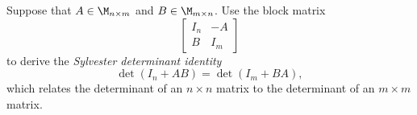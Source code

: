 \documentclass{homework}
\begin{document}
\begin{problem}[P.3.29]
  Suppose that \(A \in \M_{n\times m}\) and
  \(B \in \M_{m\times n}\).  Use the block matrix
  \[
    \begin{bmatrix}
      I_n & -A \\
      B   & I_m
    \end{bmatrix}
  \]
  to derive the \emph{Sylvester determinant identity}
  \begin{equation}
    \det(I_n + AB) = \det(I_m + BA), \label{eq:sylvester-det-identity}
  \end{equation}
  which relates the determinant of an \(n\times n\) matrix to the
  determinant of an \(m\times m\) matrix.

  \begin{solution}
  \end{solution}

\end{problem}
\end{document}

